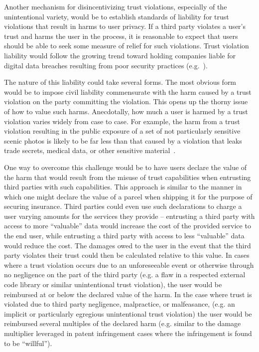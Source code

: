 Another mechanism for disincentivizing trust violations, especially of
the unintentional variety, would be to establish standards of
liability for trust violations that result in harms to user
privacy. If a third party violates a user's trust and harms the user
in the process, it is reasonable to expect that users should be able
to seek some measure of relief for such violations. Trust violation
liability would follow the growing trend toward holding companies
liable for digital data breaches resulting from poor security
practices (e.g.~\cite{ftc-asus}).

The nature of this liability could take several forms. The most
obvious form would be to impose civil liability commensurate with the
harm caused by a trust violation on the party committing the
violation. This opens up the thorny issue of how to value such
harms. Anecdotally, how much a user is harmed by a trust violation
varies widely from case to case. For example, the harm from a trust
violation resulting in the public exposure of a set of not
particularly sensitive scenic photos is likely to be far less than
that caused by a violation that leaks trade secrets, medical data, or
other sensitive material~\cite{acquisti2013, romanosky2009}.

One way to overcome this challenge would be to have users declare the
value of the harm that would result from the misuse of trust
capabilities when entrusting third parties with such
capabilities. This approach is similar to the manner in which one
might declare the value of a parcel when shipping it for the purpose
of securing insurance. Third parties could even use such declarations
to charge a user varying amounts for the services they provide --
entrusting a third party with access to more ``valuable'' data would
increase the cost of the provided service to the end user, while
entrusting a third party with access to less ``valuable'' data would
reduce the cost. The damages owed to the user in the event that the
third party violates their trust could then be calculated relative to
this value. In cases where a trust violation occurs due to an
unforeseeable event or otherwise through no negligence on the part of
the third party (e.g. a flaw in a respected external code library or
similar unintentional trust violation), the user would be reimbursed
at or below the declared value of the harm. In the case where trust is
violated due to third party negligence, malpractice, or malfeasance,
(e.g. an implicit or particularly egregious unintentional trust
violation) the user would be reimbursed several multiples of the
declared harm (e.g. similar to the damage multiplier leveraged in
patent infringement cases where the infringement is found to be
``willful'').

